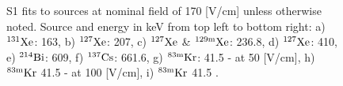 \begin{figure}[h!]
\bigskip

\hfill
{}
\hfill
{}

\caption{S1 fits to sources at nominal field of 170 [V/cm] unless otherwise noted. Source and energy in keV from top left to bottom right: a) $\rm ^{131}Xe$: 163, b) $\rm ^{127}Xe$:  207, c) $\rm ^{127}Xe$ \&  $\rm ^{129m}Xe$: 236.8, d)  $\rm ^{127}Xe$: 410, e) $\rm ^{214}Bi$: 609, f) $\rm ^{137}Cs$: 661.6, g) $\rm ^{83m}Kr$: 41.5 - at 50 [V/cm], h) $\rm ^{83m}Kr$ 41.5 - at 100 [V/cm], i) $\rm ^{83m}Kr$ 41.5 .}
\label{fig:Doke_Fits_S1}
\end{figure}



